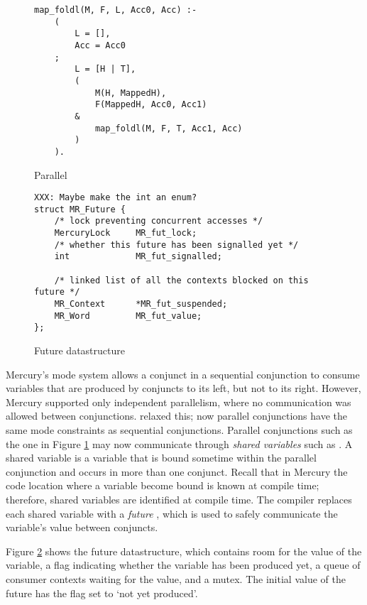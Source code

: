 

\begin{figure}
\begin{verbatim}
map_foldl(M, F, L, Acc0, Acc) :-
    (
        L = [],
        Acc = Acc0
    ;
        L = [H | T],
        (
            M(H, MappedH),
            F(MappedH, Acc0, Acc1)
        &
            map_foldl(M, F, T, Acc1, Acc)
        )
    ).
\end{verbatim}
\caption{Parallel \mapfoldl{}}
\label{fig:mapfoldl}
\end{figure}

\begin{figure}
\begin{verbatim}
XXX: Maybe make the int an enum?
struct MR_Future {
    /* lock preventing concurrent accesses */
    MercuryLock     MR_fut_lock;
    /* whether this future has been signalled yet */
    int             MR_fut_signalled;

    /* linked list of all the contexts blocked on this future */
    MR_Context      *MR_fut_suspended;
    MR_Word         MR_fut_value;
};
\end{verbatim}
\caption{Future datastructure}
\label{fig:future}
\end{figure}

Mercury's mode system allows a conjunct in a sequential conjunction to consume
variables that are produced by conjuncts to its left, but not to its right.
However, Mercury supported only independent parallelism,
where no communication was allowed between conjunctions.
\citet{wang_dep_par_conj,wang_hons_thesis} relaxed this;
now parallel conjunctions have the same mode constraints as sequential
conjunctions.
Parallel conjunctions such as the one in Figure \ref{fig:mapfoldl} may now
communicate through \emph{shared variables} such as .
A shared variable is a variable that is bound sometime within the parallel
conjunction and occurs in more than one conjunct.
Recall that in Mercury the code location where a variable become bound is known
at compile time;
therefore,
shared variables are identified at compile time.
The compiler replaces each shared variable with a \emph{future} \citep{multilisp},
which is used to safely communicate the variable's value between conjuncts.

Figure \ref{fig:future} shows the future datastructure,
which contains room for the value of the variable,
a flag indicating whether the variable has been produced yet,
a queue of consumer contexts waiting for the value, and a mutex.
The initial value of the future has the flag set to `not yet produced'.

